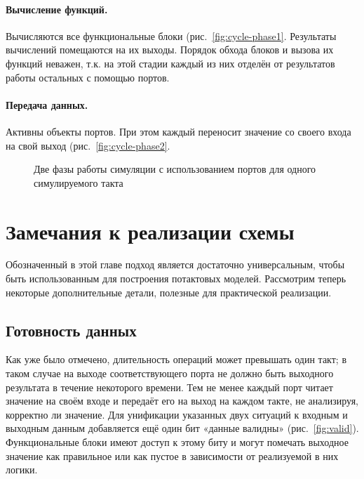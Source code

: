 \paragraph{Вычисление функций.} Вычисляются все функциональные блоки (рис.~\ref{fig:cycle-phase1}. Результаты вычислений помещаются на их выходы. Порядок обхода блоков и вызова их функций неважен, т.к. на этой стадии каждый из них отделён от результатов работы остальных с помощью портов.

\paragraph{Передача данных.} Активны объекты портов. При этом каждый переносит значение со своего входа на свой выход (рис.~\ref{fig:cycle-phase2}.

\begin{figure}[htbp]
\centering
{}
\caption[Две фазы работы потактовой симуляции с использованием портов]{Две фазы работы симуляции с использованием портов для одного симулируемого такта}
\end{figure}


\section{Замечания к реализации схемы}

Обозначенный в этой главе подход является достаточно универсальным, чтобы быть использованным для построения потактовых моделей. Рассмотрим теперь  некоторые дополнительные детали, полезные для практической реализации.

\subsection{Готовность данных}

Как уже было отмечено, длительность операций может превышать один такт; в таком случае на выходе соответствующего порта не должно быть выходного результата в течение некоторого времени. Тем не менее каждый порт читает значение на своём входе и передаёт его на выход на каждом такте, не анализируя, корректно ли значение. Для унификации указанных двух ситуаций к входным и выходным данным добавляется ещё один бит «данные валидны» (рис.~\ref{fig:valid}). Функциональные блоки имеют доступ к этому биту и могут помечать выходное значение как правильное или как пустое в зависимости от реализуемой в них логики.

